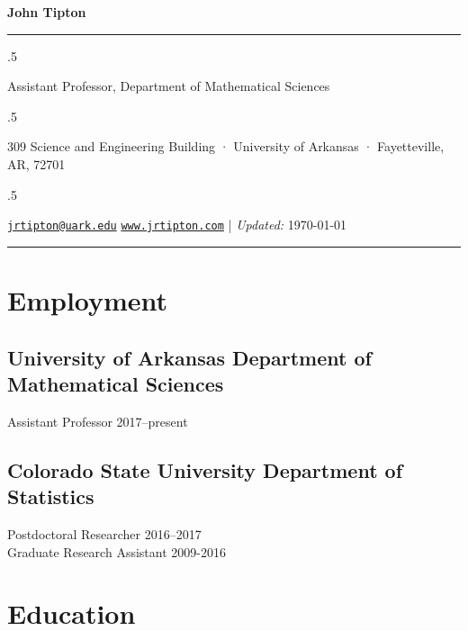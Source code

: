 \documentclass[11pt,]{article}
\begin{document}
\centerline{\huge \bf John Tipton}

\vspace{2 mm}

\hrule

\vspace{2 mm}

\moveleft.5\hoffset\centerline{Assistant Professor, Department of Mathematical Sciences}
\moveleft.5\hoffset\centerline{309 Science and Engineering Building · University of Arkansas ·
Fayetteville, AR, 72701}
\moveleft.5\hoffset\centerline{ \faEnvelopeO \hspace{1 mm} \href{mailto:}{\tt \href{mailto:jrtipton@uark.edu}{\nolinkurl{jrtipton@uark.edu}}} \hspace{1 mm}      \faGlobe \hspace{1 mm} \href{http://www.jrtipton.com}{\tt www.jrtipton.com}    | \emph{Updated:} \apstylekinda\today} 

\vspace{2 mm}

\hrule


\hypertarget{employment}{%
\section{Employment}\label{employment}}

\hypertarget{university-of-arkansas-department-of-mathematical-sciences}{%
\subsection{\texorpdfstring{University of Arkansas \hfill Department of
Mathematical
Sciences}{University of Arkansas Department of Mathematical Sciences}}\label{university-of-arkansas-department-of-mathematical-sciences}}

Assistant Professor \hfill 2017--present

\hypertarget{colorado-state-university-department-of-statistics}{%
\subsection{\texorpdfstring{Colorado State University \hfill Department
of
Statistics}{Colorado State University Department of Statistics}}\label{colorado-state-university-department-of-statistics}}

Postdoctoral Researcher \hfill 2016--2017\\
Graduate Research Assistant \hfill 2009-2016

\hypertarget{education}{%
\section{Education}\label{education}}
\end{document}
